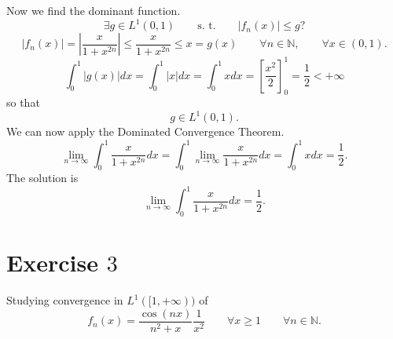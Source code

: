 \documentclass[a4paper, twoside, openany]{book}
\begin{document}
Now we find the dominant function.
$$\exists g \in L^1(0, 1) \qquad \textrm{s. t.} \qquad |f_n(x)| \leq g?$$
$$|f_n(x)| = |\frac{x}{1 + x^{2n}}| \leq \frac{x}{1 + x^{2n}} \leq x = g(x) \qquad \forall n \in \mathbb{N}, \qquad \forall x \in (0, 1).$$
$$\int_0^1 |g(x)| dx = \int_0^1 |x| dx = \int_0^1 x dx = [ \frac{x^2}{2}]_0^1 = \frac{1}{2} < +\infty$$
so that
$$g \in L^1(0,1).$$
We can now apply the Dominated Convergence Theorem.
$$\lim_{n \rightarrow \infty} \int_0^1 \frac{x}{1 + x^{2n}} dx = \int_0^1 \lim_{n \rightarrow \infty} \frac{x}{1 + x^{2n}} dx = \int_0^1 x dx = \frac{1}{2}.$$
The solution is
$$\lim_{n \rightarrow \infty} \int_0^1 \frac{x}{1 + x^{2n}} dx = \frac{1}{2}.$$
\clearpage
\section*{Exercise $3$}
Studying convergence in $L^1([1, +\infty))$ of
$$f_n(x) = \frac{\cos(nx)}{n^2 + x} \frac{1}{x^2} \qquad \forall x \geq 1 \qquad \forall n \in \mathbb{N}.$$
\end{document}
